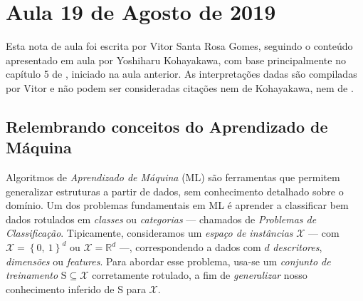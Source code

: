 \section{Aula 19 de Agosto de 2019}
\label{2019_08_19}

Esta nota de aula foi escrita por Vitor Santa Rosa Gomes, seguindo o conteúdo apresentado em aula por Yoshiharu Kohayakawa, com base principalmente no capítulo 5 de \cite[p.~129]{blum_hopcroft}, iniciado na aula anterior. As interpretações dadas são compiladas por Vitor e não podem ser consideradas citações nem de Kohayakawa, nem de \cite{blum_hopcroft}.

\subsection*{Relembrando conceitos do Aprendizado de Máquina}

Algoritmos de \textit{Aprendizado de Máquina} (ML) são ferramentas que permitem generalizar estruturas a partir de dados, sem conhecimento detalhado sobre o domínio. Um dos problemas fundamentais em ML é aprender a classificar bem dados rotulados em \textit{classes} ou \textit{categorias} --- chamados de \textit{Problemas de Classificação}. Tipicamente, consideramos um \textit{espaço de instâncias} $\mathcal{X}$ --- com $\mathcal{X}=\left\{0,\ 1\right\}^d$ ou $\mathcal{X}=\mathds{R}^d$ ---, correspondendo a dados com $d$ \textit{descritores}, \textit{dimensões} ou \textit{features}. Para abordar esse problema, usa-se um \textit{conjunto de treinamento} $\mathrm{S}\subseteq\mathcal{X}$ corretamente rotulado, a fim de \textit{generalizar} nosso conhecimento inferido de $\mathrm{S}$ para $\mathcal{X}$.

